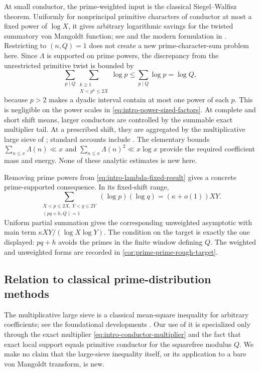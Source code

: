 At small conductor, the prime-weighted input is the classical
Siegel--Walfisz theorem.  Uniformly for nonprincipal primitive characters of
conductor at most a fixed power of $\log X$, it gives arbitrary logarithmic
savings for the twisted summatory von Mangoldt function; see
\citet{Siegel1935,Walfisz1936} and the modern formulation in
\citet[Corollary~5.29]{IwaniecKowalski2004}.  Restricting to $(n,Q)=1$ does
not create a new prime-character-sum problem here.  Since $\Lambda$ is
supported on prime powers, the discrepancy from the unrestricted primitive
twist is bounded by
\begin{equation}\label{eq:intro-rough-lambda-comparison}
 \sum_{p\mid Q}\sum_{\substack{k\ge1\\X<p^k\le2X}}\log p
 \le \sum_{p\mid Q}\log p=\log Q,
\end{equation}
because $p>2$ makes a dyadic interval contain at most one power of each
$p$.  This is negligible on the power scales in
\eqref{eq:intro-power-sized-factors}.  At complete and short shift means,
larger conductors are controlled by the summable exact multiplier tail.  At
a prescribed shift, they are aggregated by the multiplicative large sieve of
\citet{MontgomeryVaughan1973}; standard accounts include
\citet[Chapter~7]{IwaniecKowalski2004}.  The elementary bounds
$\sum_{n\le x}\Lambda(n)\ll x$ and
$\sum_{n\le x}\Lambda(n)^2\ll x\log x$ provide the required coefficient
mass and energy.  None of these analytic estimates is new here.

Removing prime powers from \eqref{eq:intro-lambda-fixed-result} gives a
concrete prime-supported consequence.  In its fixed-shift range,
\begin{equation}\label{eq:intro-prime-prime-rough-asymptotic}
 \sum_{\substack{X<p\le2X,\ Y<q\le2Y\\(pq+h,Q)=1}}
 (\log p)(\log q)
 =(\kappa+o(1))XY.
\end{equation}
Uniform partial summation gives the corresponding unweighted asymptotic
with main term
$\kappa XY/(\log X\log Y)$.  The condition on the target is exactly the one
displayed: $pq+h$ avoids the primes in the finite window defining $Q$.
The weighted and unweighted forms are recorded in
\cref{cor:prime-prime-rough-target}.

\subsection{Relation to classical prime-distribution methods}

The multiplicative large sieve is a classical mean-square inequality for
arbitrary coefficients; see the foundational developments
\citep{Bombieri1965,DavenportHalberstam1966,Gallagher1967,MontgomeryVaughan1973}.
Our use of it is specialized only through the exact multiplier
\eqref{eq:intro-conductor-multiplier} and the fact that exact local support
equals primitive conductor for the squarefree modulus $Q$.  We make no
claim that the large-sieve inequality itself, or its application to a bare
von Mangoldt transform, is new.

